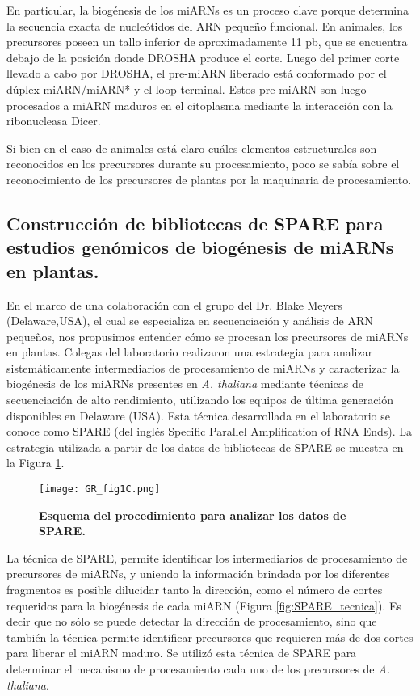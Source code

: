 En particular, la biogénesis de los miARNs es un proceso clave porque determina la secuencia exacta de nucleótidos del ARN pequeño funcional.
En animales, los precursores poseen un tallo inferior de aproximadamente 11 pb, que se encuentra debajo de la posición donde DROSHA produce el corte.
Luego del primer corte llevado a cabo por DROSHA, el pre-miARN liberado está conformado por el dúplex miARN/miARN* y el loop terminal.
Estos pre-miARN son luego procesados a miARN maduros en el citoplasma mediante la interacción con la ribonucleasa Dicer.

Si bien en el caso de animales está claro cuáles elementos estructurales son reconocidos en los precursores durante su procesamiento, poco se sabía sobre el reconocimiento de los precursores de plantas por la maquinaria de procesamiento.

\subsection{Construcción de bibliotecas de SPARE para estudios genómicos de biogénesis de miARNs en plantas.}

En el marco de una colaboración con el grupo del Dr. Blake Meyers (Delaware,USA), el cual se especializa en secuenciación y análisis de ARN pequeños, nos propusimos entender cómo se procesan los precursores de miARNs en plantas. 
Colegas del laboratorio realizaron una estrategia para analizar sistemáticamente intermediarios de procesamiento de miARNs y caracterizar la biogénesis de los miARNs presentes en \textit{A. thaliana} mediante técnicas de secuenciación de alto rendimiento, utilizando los equipos de última generación disponibles en Delaware (USA).
Esta técnica desarrollada en el laboratorio se conoce como SPARE \citep{Schapire2013} (del inglés Specific Parallel Amplification of RNA Ends).
La estrategia utilizada a partir de los datos de bibliotecas de SPARE se muestra en la Figura \ref{fig:GR_fig1C}.

\begin{figure}[htbp!] 
    \centering    
    \texttt{[image: GR\_fig1C.png]}
    \caption[Esquema del procedimiento para analizar los datos de SPARE]{
        \textbf{Esquema del procedimiento para analizar los datos de SPARE.}
    }
    \label{fig:GR_fig1C}
\end{figure}

La técnica de SPARE, permite identificar los intermediarios de procesamiento de precursores de miARNs, y uniendo la información brindada por los diferentes fragmentos es posible dilucidar tanto la dirección, como el número de cortes requeridos para la biogénesis de cada miARN (Figura \ref{fig:SPARE_tecnica}).
Es decir que no sólo se puede detectar la dirección de procesamiento, sino que también la técnica permite identificar precursores que requieren más de dos cortes para liberar el miARN maduro.
Se utilizó esta técnica de SPARE para determinar el mecanismo de procesamiento cada uno de los precursores de \textit{A. thaliana}.

